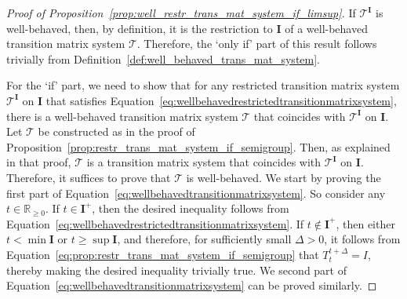 \documentclass[10pt,a4paper]{paper}
\theoremstyle{definition}
\newcommand{\reals}{\mathbb{R}}
\newcommand{\realsnonneg}{\reals_{\geq 0}}
\newcommand{\norm}[1]{\left\lVert #1 \right\rVert}
\newcommand{\coloneqq}{:\!=}
\begin{document}
\begin{proof}[Proof of Proposition~\ref{prop:well_restr_trans_mat_system_if_limsup}]
If $\mathcal{T}^{\mathbf{I}}$ is well-behaved, then, by definition, it is the restriction to $\mathbf{I}$ of a well-behaved transition matrix system $\mathcal{T}$. Therefore, the `only if' part of this result follows trivially from Definition~\ref{def:well_behaved_trans_mat_system}.

For the `if' part, we need to show that for any restricted transition matrix system $\mathcal{T}^\mathbf{I}$ on $\mathbf{I}$ that satisfies Equation~\eqref{eq:wellbehavedrestrictedtransitionmatrixsystem}, there is a well-behaved transition matrix system $\mathcal{T}$ that coincides with $\mathcal{T}^\mathbf{I}$ on $\mathbf{I}$. Let $\mathcal{T}$ be constructed as in the proof of Proposition~\ref{prop:restr_trans_mat_system_if_semigroup}. Then, as explained in that proof, $\mathcal{T}$ is a transition matrix system that coincides with $\mathcal{T}^{\mathbf{I}}$ on $\mathbf{I}$. Therefore, it suffices to prove that $\mathcal{T}$ is well-behaved. We start by proving the first part of Equation~\eqref{eq:wellbehavedtransitionmatrixsystem}. So consider any $t\in\realsnonneg$. If $t\in\mathbf{I}^+$, then the desired inequality follows from Equation~\eqref{eq:wellbehavedrestrictedtransitionmatrixsystem}. If $t\notin\mathbf{I}^+$, then either $t<\min\mathbf{I}$ or $t\geq\sup\mathbf{I}$, and therefore, for sufficiently small $\Delta>0$, it follows from Equation~\eqref{eq:prop:restr_trans_mat_system_if_semigroup} that $T_t^{t+\Delta}=I$, thereby making the desired inequality trivially true. We second part of Equation~\eqref{eq:wellbehavedtransitionmatrixsystem} can be proved similarly.
\end{proof}
\end{document}
